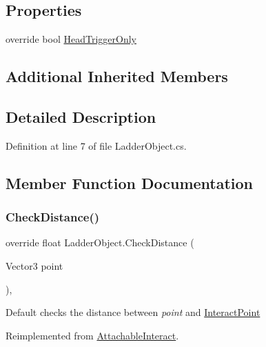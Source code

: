 \subsection*{Properties}
\begin{DoxyCompactItemize}
\item 
override bool \mbox{\hyperlink{class_ladder_object_a5034b325b06adadbf863c453ad06f1bd}{Head\+Trigger\+Only}}
\end{DoxyCompactItemize}
\subsection*{Additional Inherited Members}


\subsection{Detailed Description}


Definition at line 7 of file Ladder\+Object.\+cs.



\subsection{Member Function Documentation}
\mbox{\label{class_ladder_object_a9199b2da6f97c758e595a4ccdf7c98b0}} 
\subsubsection{\texorpdfstring{Check\+Distance()}{CheckDistance()}}
{\footnotesize\ttfamily override float Ladder\+Object.\+Check\+Distance (\begin{DoxyParamCaption}\item[{Vector3}]{point }\end{DoxyParamCaption})\hspace{0.3cm}{\ttfamily [protected]}, {\ttfamily [virtual]}}



Default checks the distance between {\itshape point}  and \mbox{\hyperlink{class_attachable_interact_ad46e0ca3808d58ab5e1102e379d6cb7e}{Interact\+Point}} 



Reimplemented from \mbox{\hyperlink{class_attachable_interact_aa6b840e4c36f09981e31b2b33bc9d45a}{Attachable\+Interact}}.



